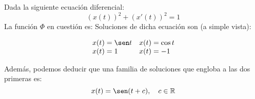 \begin{ejemplo}
    Dada la siguiente ecuación diferencial:
    \begin{equation*}
        {(x(t))}^{2} + {(x'(t))}^{2} = 1
    \end{equation*}
    La función $\Phi$ en cuestión es:
    Soluciones de dicha ecuación son (a simple vista):

    \begin{equation*}
    \begin{array}{ll}
        x(t) = \sen t & x(t) = \cos t \\
        x(t) = 1 & x(t) = -1
    \end{array}
    \end{equation*}

    Además, podemos deducir que una familia de soluciones que engloba a las dos primeras es:
    \begin{equation*}
        x(t) = \sen(t+c), \quad c\in \mathbb{R}
    \end{equation*}

\ifdefined\showimages
    \begin{center}
\end{center}
\end{ejemplo}
